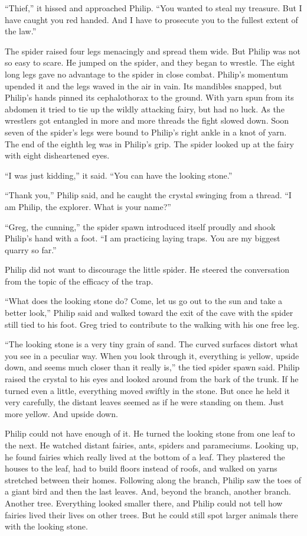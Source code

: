 \documentclass[10pt, draft]{memoir}
\begin{document}
``Thief,'' it hissed and approached Philip. ``You wanted to steal my treasure.
But I have caught you red handed. And I have to prosecute you to the fullest
extent of the law.''

The spider raised four legs menacingly and spread them wide. But Philip was not
so easy to scare. He jumped on the spider, and they began to wrestle. The eight
long legs gave no advantage to the spider in close combat. Philip's momentum
upended it and the legs waved in the air in vain. Its mandibles snapped, but
Philip's hands pinned its cephalothorax to the ground. With yarn spun from its
abdomen it tried to tie up the wildly attacking fairy, but had no luck. As the
wrestlers got entangled in more and more threads the fight slowed down. Soon
seven of the spider's legs were bound to Philip's right ankle in a knot of
yarn. The end of the eighth leg was in Philip's grip. The spider looked up at
the fairy with eight disheartened eyes.

``I was just kidding,'' it said. ``You can have the looking stone.''

``Thank you,'' Philip said, and he caught the crystal swinging from a thread.
``I am Philip, the explorer. What is your name?''

``Greg, the cunning,'' the spider spawn introduced itself proudly and shook
Philip's hand with a foot. ``I am practicing laying traps. You are my biggest
quarry so far.''

Philip did not want to discourage the little spider. He steered the
conversation from the topic of the efficacy of the trap.

``What does the looking stone do? Come, let us go out to the sun and take a
better look,'' Philip said and walked toward the exit of the cave with the
spider still tied to his foot. Greg tried to contribute to the walking with his
one free leg.

``The looking stone is a very tiny grain of sand. The curved surfaces distort
what you see in a peculiar way. When you look through it, everything is yellow,
upside down, and seems much closer than it really is,'' the tied spider spawn
said. Philip raised the crystal to his eyes and looked around from the bark of
the trunk. If he turned even a little, everything moved swiftly in the stone.
But once he held it very carefully, the distant leaves seemed as if he were
standing on them. Just more yellow. And upside down.

Philip could not have enough of it. He turned the looking stone from one leaf
to the next. He watched distant fairies, ants, spiders and parameciums. Looking
up, he found fairies which really lived at the bottom of a leaf. They plastered
the houses to the leaf, had to build floors instead of roofs, and walked on
yarns stretched between their homes. Following along the branch, Philip saw the
toes of a giant bird and then the last leaves. And, beyond the branch, another
branch. Another tree. Everything looked smaller there, and Philip could not
tell how fairies lived their lives on other trees. But he could still spot
larger animals there with the looking stone.
\end{document}
